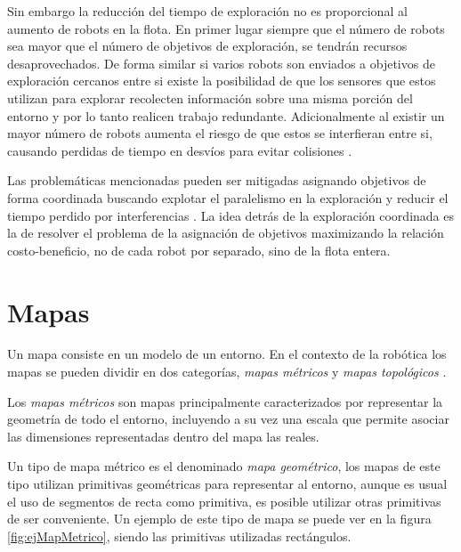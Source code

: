 Sin embargo la reducción del tiempo de exploración no es proporcional al
aumento de robots en la flota. En primer lugar siempre que el número de robots
sea mayor que el número de objetivos de exploración, se tendrán recursos
desaprovechados. De forma similar si varios robots son enviados a objetivos de
exploración cercanos entre si existe la posibilidad de que los sensores que
estos utilizan para explorar recolecten información sobre una misma porción del
entorno y por lo tanto realicen trabajo redundante. Adicionalmente al existir
un mayor número de robots aumenta el riesgo de que estos se interfieran entre
si, causando perdidas de tiempo en desvíos para evitar colisiones
\cite{guzzoni1997many,goldberg1997interference}. 

Las problemáticas mencionadas pueden ser mitigadas asignando objetivos de forma
coordinada buscando explotar el paralelismo en la exploración y reducir el
tiempo perdido por interferencias \cite{nieto2014coordination}. La idea detrás
de la exploración coordinada es la de resolver el problema de la asignación de
objetivos maximizando la relación costo-beneficio, no de cada robot por separado,
sino de la flota entera.




\section{Mapas}\label{subsec:mapas} %
Un mapa consiste en un modelo de un entorno. En el contexto de la robótica los mapas se pueden dividir en dos categorías, \emph{mapas métricos} y \emph{mapas topológicos} \cite{Thrun1998,choset2005principles}.

Los \emph{mapas métricos} son mapas principalmente caracterizados por representar la geometría de todo el entorno, incluyendo a su vez una escala que permite asociar las dimensiones representadas dentro del mapa las reales.

Un tipo de mapa métrico es el denominado \emph{mapa geométrico}, los mapas de este tipo utilizan primitivas geométricas para representar al entorno, aunque es usual el uso de segmentos de recta como primitiva, es posible utilizar otras primitivas de ser conveniente. Un ejemplo de este tipo de mapa se puede ver en la figura \ref{fig:ejMapMetrico}, siendo las primitivas utilizadas rectángulos.

